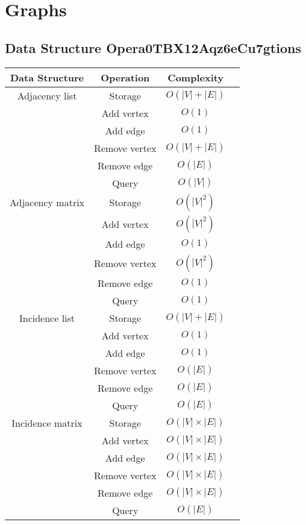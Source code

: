 \documentclass{article}
\begin{document}
\newpage
\section*{Graphs}
\subsection*{Data Structure Opera0TBX12Aqz6eCu7gtions}

\begin{table}[ht]
	\centering
	\scriptsize
	\begin{tabular}{cccc}
		\textbf{Data Structure} & \textbf{Operation} & \textbf{Complexity} \\
		\hline
		Adjacency list & Storage &  $O(|V|+|E|)$  \\
		& Add vertex & $O(1)$  \\
		& Add edge & $O(1)$  \\
		& Remove vertex & $O(|V|+|E|)$  \\
		& Remove edge & $O(|E|)$  \\
		& Query & $O(|V|)$  \\
		\hline
		Adjacency matrix & Storage & $O(|V|^2)$  \\
		& Add vertex & $O(|V|^2)$  \\
		& Add edge & $O(1)$  \\
		& Remove vertex & $O(|V|^2)$  \\
		& Remove edge & $O(1)$  \\
		& Query & $O(1)$  \\
		\hline
		Incidence list & Storage &  $O(|V|+|E|)$  \\
		& Add vertex & $O(1)$  \\
		& Add edge & $O(1)$  \\
		& Remove vertex & $O(|E|)$  \\
		& Remove edge & $O(|E|)$  \\
		& Query & $O(|E|)$  \\
		\hline
		Incidence matrix & Storage &  $O(|V|\times|E|)$  \\
		& Add vertex & $O(|V|\times|E|)$  \\
		& Add edge & $O(|V|\times|E|)$  \\
		& Remove vertex & $O(|V|\times|E|)$  \\
		& Remove edge & $O(|V|\times|E|)$  \\
		& Query & $O(|E|)$  \\
		\hline
	\end{tabular}
\end{table}
\end{document}

